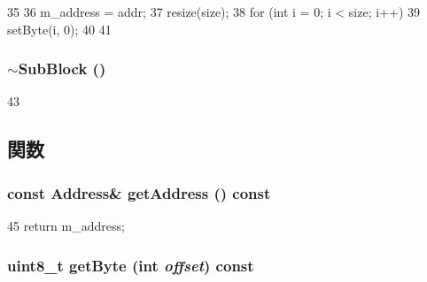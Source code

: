 \begin{DoxyCode}
35 {
36     m_address = addr;
37     resize(size);
38     for (int i = 0; i < size; i++) {
39         setByte(i, 0);
40     }
41 }
\end{DoxyCode}
\hypertarget{classSubBlock_a8cf1f79e8bf95f0e2cc010d7768bb7ed}{
\subsubsection[{$\sim$SubBlock}]{\setlength{\rightskip}{0pt plus 5cm}$\sim${\bf SubBlock} ()}}
\label{classSubBlock_a8cf1f79e8bf95f0e2cc010d7768bb7ed}



\begin{DoxyCode}
43 { }
\end{DoxyCode}


\subsection{関数}
\hypertarget{classSubBlock_aca15ef966561def0b4db75a6f7e085b6}{
\subsubsection[{getAddress}]{\setlength{\rightskip}{0pt plus 5cm}const {\bf Address}\& getAddress () const}}
\label{classSubBlock_aca15ef966561def0b4db75a6f7e085b6}



\begin{DoxyCode}
45 { return m_address; }
\end{DoxyCode}
\hypertarget{classSubBlock_a70e6dc2ffdce33da348b9bd615061820}{
\subsubsection[{getByte}]{\setlength{\rightskip}{0pt plus 5cm}uint8\_\-t getByte (int {\em offset}) const}}
\label{classSubBlock_a70e6dc2ffdce33da348b9bd615061820}



